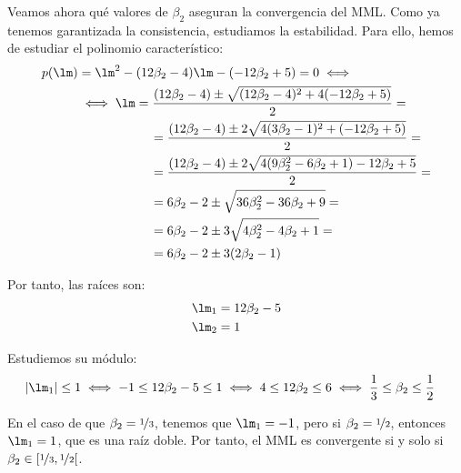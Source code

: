 \begin{ejercicio}
    Veamos ahora qué valores de $\beta_2$ aseguran la convergencia del MML. Como ya tenemos garantizada la consistencia, estudiamos la estabilidad. Para ello, hemos de estudiar el polinomio característico:
    \begin{align*}
        p(\lm) &= \lm^2 - (12\beta_2 - 4)\lm - (-12\beta_2 + 5)
        = 0\iff \\&\iff
        \lm = \dfrac{(12\beta_2 - 4) \pm \sqrt{(12\beta_2 - 4)^2 + 4(-12\beta_2 + 5)}}{2}
        =\\&\hspace{2cm}= \dfrac{(12\beta_2 - 4) \pm 2\sqrt{4(3\beta_2 - 1)^2 + (-12\beta_2 + 5)}}{2}
        =\\&\hspace{2cm}= \dfrac{(12\beta_2 - 4) \pm 2\sqrt{4(9\beta_2^2 - 6\beta_2 + 1) -12\beta_2 + 5}}{2}
        =\\&\hspace{2cm}= 6\beta_2 - 2 \pm \sqrt{36\beta_2^2 -36\beta_2 +9}
        =\\&\hspace{2cm}= 6\beta_2 - 2 \pm 3\sqrt{4\beta_2^2 -4\beta_2 +1}
        =\\&\hspace{2cm}= 6\beta_2 - 2 \pm 3(2\beta_2 - 1)
    \end{align*}

    Por tanto, las raíces son:
    \begin{align*}
        \lm_1 &= 12\beta_2 - 5\\
        \lm_2 &= 1
    \end{align*}

    Estudiemos su módulo:
    \begin{align*}
        |\lm_1| \leq 1 &\iff -1 \leq 12\beta_2 - 5 \leq 1
        \iff 4 \leq 12\beta_2 \leq 6
        \iff \frac{1}{3} \leq \beta_2 \leq \frac{1}{2}
    \end{align*}

    En el caso de que $\beta_2 = \nicefrac{1}{3}$, tenemos que $\lm_1 = -1$, pero si $\beta_2 = \nicefrac{1}{2}$, entonces $\lm_1 = 1$, que es una raíz doble. Por tanto, el MML es convergente si y solo si $\beta_2\in \left[\nicefrac{1}{3},\nicefrac{1}{2}\right[$.
\end{ejercicio}

